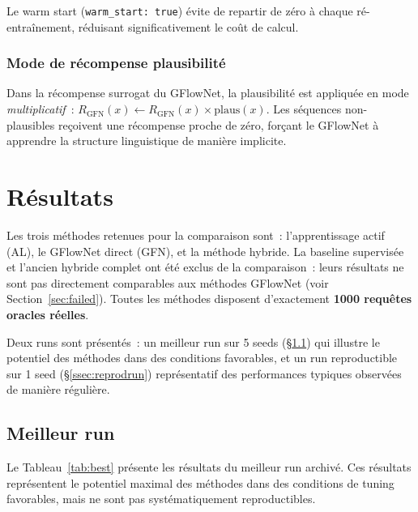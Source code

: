 \documentclass[10pt]{article}
\begin{document}
Le warm start (\texttt{warm\_start: true}) évite de repartir de zéro à chaque ré-entraînement, réduisant significativement le coût de calcul.

\subsubsection{Mode de récompense plausibilité}

Dans la récompense surrogat du GFlowNet, la plausibilité est appliquée en mode \emph{multiplicatif}~: $R_{\text{GFN}}(x) \leftarrow R_{\text{GFN}}(x) \times \text{plaus}(x)$. Les séquences non-plausibles reçoivent une récompense proche de zéro, forçant le GFlowNet à apprendre la structure linguistique de manière implicite.

\section{Résultats}

Les trois méthodes retenues pour la comparaison sont~: l'apprentissage actif (AL), le GFlowNet direct (GFN), et la méthode hybride. La baseline supervisée et l'ancien hybride complet ont été exclus de la comparaison~: leurs résultats ne sont pas directement comparables aux méthodes GFlowNet (voir Section~\ref{sec:failed}). Toutes les méthodes disposent d'exactement \textbf{1000 requêtes oracles réelles}.

Deux runs sont présentés~: un meilleur run sur 5 seeds (\S\ref{ssec:bestrun}) qui illustre le potentiel des méthodes dans des conditions favorables, et un run reproductible sur 1 seed (\S\ref{ssec:reprodrun}) représentatif des performances typiques observées de manière régulière.

\subsection{Meilleur run}
\label{ssec:bestrun}

Le Tableau~\ref{tab:best} présente les résultats du meilleur run archivé. Ces résultats représentent le potentiel maximal des méthodes dans des conditions de tuning favorables, mais ne sont pas systématiquement reproductibles.

\begin{table}[h]
\centering
\small
{}
\label{tab:best}
\end{table}
\end{document}
